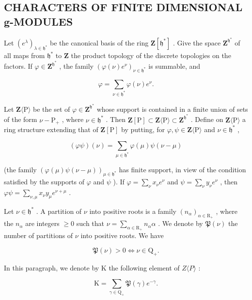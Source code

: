 \subsection{CHARACTERS OF FINITE DIMENSIONAL g-MODULES}

Let \((e^{\lambda})_{\lambda \in \mathfrak{h}^{*}}\) be the canonical basis of the ring \(\mathbf{Z}[\mathfrak{h}^*]\) . Give the space \(\mathbf{Z}^{\mathfrak{h}^*}\) of all maps from \(\mathfrak{h}^*\) to \(\mathbf{Z}\) the product topology of the discrete topologies on the factors. If \(\varphi \in \mathbf{Z}^{\mathfrak{h}^*}\) , the family \((\varphi (\nu)e^{\nu})_{\nu \in \mathfrak{h}^*}\) is summable, and

\[
\varphi = \sum_ {\nu \in \mathfrak {h} ^ {*}} \varphi (\nu) e ^ {\nu}.
\]

Let \(\mathbf{Z}\langle\mathrm{P}\rangle\) be the set of \(\varphi\in\mathbf{Z}^{\mathfrak{h}^{*}}\) whose support is contained in a finite union of sets of the form \(\nu-\mathrm{P}_{+}\) , where \(\nu\in\mathfrak{h}^{*}\) . Then \(\mathbf{Z}[\mathrm{P}]\subset\mathbf{Z}\langle\mathrm{P}\rangle\subset\mathbf{Z}^{\mathfrak{h}^{*}}\) . Define on \(\mathbf{Z}\langle\mathrm{P}\rangle\) a ring structure extending that of \(\mathbf{Z}[\mathrm{P}]\) by putting, for \(\varphi,\psi\in\mathbf{Z}\langle\mathrm{P}\rangle\) and \(\nu\in\mathfrak{h}^{*}\) ,

\[
(\varphi \psi) (\nu) = \sum_ {\mu \in \mathfrak {h} ^ {*}} \varphi (\mu) \psi (\nu - \mu)
\]

(the family \((\varphi(\mu)\psi(\nu - \mu))_{\mu \in \mathfrak{h}^*}\) has finite support, in view of the condition satisfied by the supports of \(\varphi\) and \(\psi\) ). If \(\varphi = \sum_{\nu} x_{\nu} e^{\nu}\) and \(\psi = \sum_{\nu} y_{\nu} e^{\nu}\) , then \(\varphi \psi = \sum_{\nu, \mu} x_{\nu} y_{\mu} e^{\nu + \mu}\) .

Let \(\nu \in \mathfrak{h}^*\) . A partition of \(\nu\) into positive roots is a family \((n_{\alpha})_{\alpha \in \mathrm{R}_{+}}\) , where the \(n_{\alpha}\) are integers \(\geq 0\) such that \(\nu = \sum_{\alpha \in \mathrm{R}_{+}} n_{\alpha} \alpha\) . We denote by \(\mathfrak{P}(\nu)\) the number of partitions of \(\nu\) into positive roots. We have

\[
\mathfrak {P} (\nu) > 0 \Longleftrightarrow \nu \in \mathrm{Q} _ {+}.
\]

In this paragraph, we denote by K the following element of \(Z\langle P\rangle\) :

\[
\mathrm{K} = \sum_ {\gamma \in \mathrm{Q} _ {+}} \mathfrak {P} (\gamma) e ^ {- \gamma}.
\]

